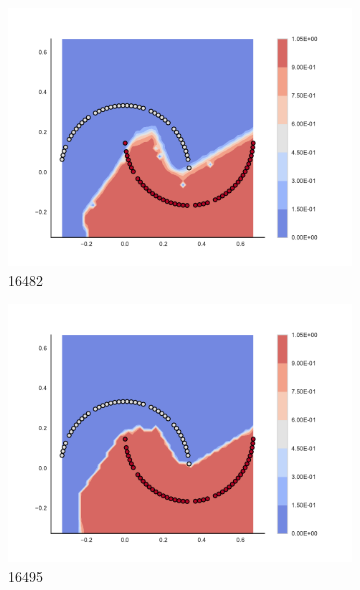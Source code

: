 \begin{figure}[h]
\begin{subfigure}[b]{0.09\textwidth}
    \includegraphics[clip, trim=2.35cm 1.75cm 4.5cm 0cm,width=\textwidth]{img/convergence/16482.pdf}
    \caption{16482}
    \label{fig:convergence_16482}
\end{subfigure}
%
\begin{subfigure}[b]{0.09\textwidth}
    \includegraphics[clip, trim=2.35cm 1.75cm 4.5cm 0cm,width=\textwidth]{img/convergence/16495.pdf}
    \caption{16495}
    \label{fig:convergence_16495}
\end{subfigure}
%
\begin{subfigure}[b]{0.09\textwidth}

\end{subfigure}
\end{figure}
